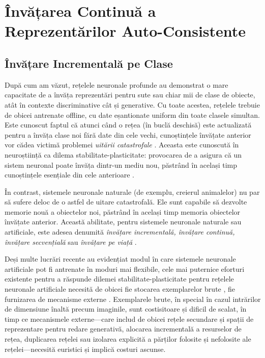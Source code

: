 \documentclass[../../book-main_ro.tex]{subfiles}
\begin{document}
\section{Învățarea Continuă a Reprezentărilor Auto-Consistente}
\label{sec:continuous}

\subsection{Învățare Incrementală pe Clase}
\label{sec:class-wise-incremental}

După cum am văzut, rețelele neuronale profunde au demonstrat o mare capacitate de a învăța reprezentări pentru sute sau chiar mii de clase de obiecte, atât în contexte discriminative cât și generative. Cu toate acestea, rețelele trebuie de obicei antrenate offline, cu date eșantionate uniform din toate clasele simultan. Este cunoscut faptul că atunci când o rețea (în buclă deschisă) este actualizată pentru a învăța clase noi fără date din cele vechi, cunoștințele învățate anterior vor cădea victimă problemei {\em uitării catastrofale} \cite{McCloskey1989catastrophic}. Aceasta este cunoscută în neuroștiință ca dilema stabilitate-plasticitate: provocarea de a asigura că un sistem neuronal poate învăța dintr-un mediu nou, păstrând în același timp cunoștințele esențiale din cele anterioare \cite{Grossberg1987CompetitiveLF}.

În contrast, sistemele neuronale naturale (de exemplu, creierul animalelor) nu par să sufere deloc de o astfel de uitare catastrofală. Ele sunt capabile să dezvolte memorie nouă a obiectelor noi, păstrând în același timp memoria obiectelor învățate anterior. Această abilitate, pentru sistemele neuronale naturale sau artificiale, este adesea denumită {\em învățare incrementală, învățare continuă, învățare secvențială} sau {\em învățare pe viață} \cite{controlled-forgetting}.



Deși multe lucrări recente au evidențiat modul în care sistemele neuronale artificiale pot fi antrenate în moduri mai flexibile, cele mai puternice eforturi existente pentru a răspunde dilemei stabilitate-plasticitate pentru rețelele neuronale artificiale necesită de obicei fie stocarea exemplarelor brute \cite{icarl,chaudhry2019tiny}, fie furnizarea de mecanisme externe \cite{EWC}. Exemplarele brute, în special în cazul intrărilor de dimensiune înaltă precum imaginile, sunt costisitoare și dificil de scalat, în timp ce mecanismele externe---care includ de obicei rețele secundare și spații de reprezentare pentru redare generativă, alocarea incrementală a resurselor de rețea, duplicarea rețelei sau izolarea explicită a părților folosite și nefolosite ale rețelei---necesită euristici și implică costuri ascunse.
\end{document}
